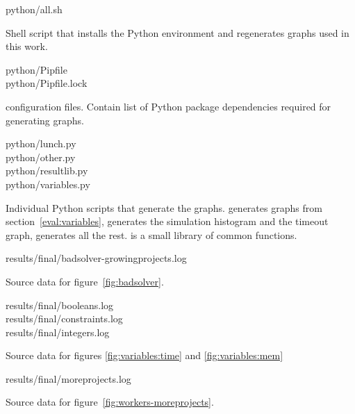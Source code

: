 \begin{filepath}
python/all.sh
\end{filepath}
\begin{dsldesc}
    Shell script that installs the Python environment and regenerates graphs used in
    this work.
\end{dsldesc}

\begin{filepath}
python/Pipfile\\
python/Pipfile.lock
\end{filepath}
\begin{dsldesc}
     configuration files. Contain list of Python package dependencies
    required for generating graphs.
\end{dsldesc}

\begin{filepath}
python/lunch.py\\
python/other.py\\
python/resultlib.py\\
python/variables.py
\end{filepath}
\begin{dsldesc}
    Individual Python scripts that generate the graphs.  generates
    graphs from section~\ref{eval:variables},  generates the simulation
    histogram and the timeout graph,  generates all the rest.
     is a small library of common functions.
\end{dsldesc}

\begin{filepath}
results/final/badsolver-growingprojects.log
\end{filepath}
\begin{dsldesc}
    Source data for figure~\ref{fig:badsolver}.
\end{dsldesc}

\pagebreak
\begin{filepath}
results/final/booleans.log\\
results/final/constraints.log\\
results/final/integers.log
\end{filepath}
\begin{dsldesc}
    Source data for figures \ref{fig:variables:time} and \ref{fig:variables:mem}
\end{dsldesc}

\begin{filepath}
results/final/moreprojects.log
\end{filepath}
\begin{dsldesc}
    Source data for figure~\ref{fig:workers-moreprojects}.
\end{dsldesc}

